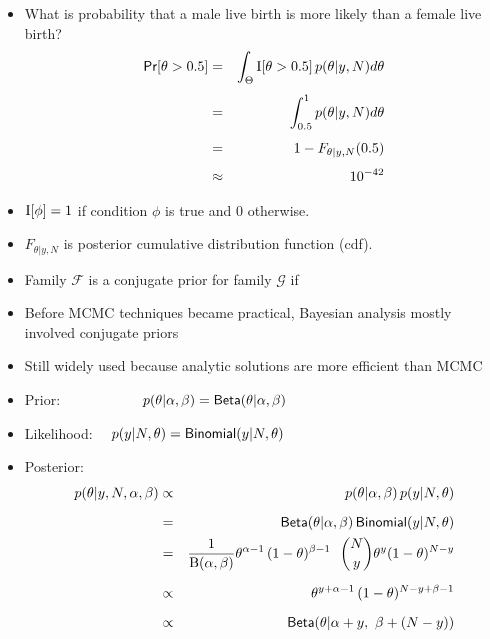\documentclass[10pt]{report}
\begin{document}
%
\begin{itemize}
\item What is probability that a male live birth is more likely than a
  female live birth?
\begin{eqnarray*}
\text{\sf Pr}[\theta > 0.5]
& = &  \int_{\Theta} \text{I}[\theta > 0.5] \, p(\theta|y,N) d\theta
\\[4pt]
& = &  \int_{0.5}^1 p(\theta|y,N) d\theta
\\[4pt]
& = &  1 - F_{\theta|y,N}(0.5)
\\[4pt]
& \approx &  10^{-42}
\end{eqnarray*}
\item $\text{I}[\phi] = 1$ if condition $\phi$ is true and 0 otherwise.
\item  $F_{\theta|y,N}$ is posterior cumulative distribution
function (cdf).
\end{itemize}





%
\begin{itemize}
\item Family $\mathcal{F}$ is a conjugate prior for family
  $\mathcal{G}$ if
\item Before MCMC techniques became practical, Bayesian analysis
  mostly involved conjugate priors
\item Still widely used because analytic solutions are more efficient
  than MCMC
\end{itemize}

%
\vspace*{-2pt}
\begin{itemize}
\item Prior: \ \ \ \ \ \ \ \ \ \ \ $p(\theta|\alpha,\beta) =
  \text{\sf Beta}(\theta|\alpha,\beta)$
\item Likelihood: \ \ $p(y|N,\theta) = \text{\sf Binomial}(y|N,\theta)$
\item Posterior:
{\small
\begin{eqnarray*}
p(\theta|y,N,\alpha,\beta)
& \propto & p(\theta|\alpha,\beta) \, p(y|N,\theta)
\\[6pt]
& = & \text{\sf Beta}(\theta|\alpha,\beta)
      \, \text{\sf Binomial}(y|N,\theta)
\\
& = & \frac{1}{{\text B}(\alpha,\beta)}
      \theta^{\alpha - 1} \,
      (1 - \theta)^{\beta-1}
      \ \
      \binom{N}{y} \theta^{y} (1 - \theta)^{N-y}
\\[6pt]
& \propto &
      \theta^{y + \alpha - 1} \,
      (1 - \theta)^{N - y + \beta - 1}
\\[6pt]
& \propto & \text{\sf Beta}(\theta|\alpha + y, \ \beta + (N - y))
\end{eqnarray*}
}
\end{itemize}
\end{document}
